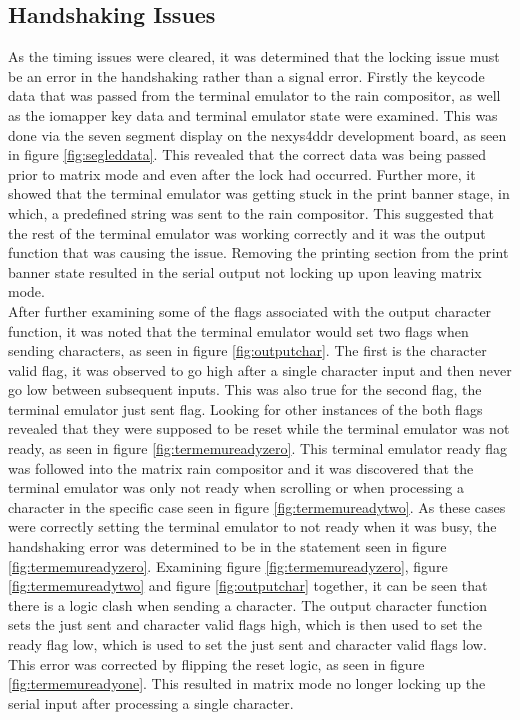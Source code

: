 \subsection{Handshaking Issues}

\label{Ch5 Sec1 Sub3}

As the timing issues were cleared, it was determined that the locking issue must be an error in the handshaking rather than a signal error. Firstly the keycode data that was passed from the terminal emulator to the rain compositor, as well as the iomapper key data and terminal emulator state were examined. This was done via the seven segment display on the nexys4ddr development board, as seen in figure \ref{fig:segleddata}. This revealed that the correct data was being passed prior to matrix mode and even after the lock had occurred. Further more, it showed that the terminal emulator was getting stuck in the print banner stage, in which, a predefined string was sent to the rain compositor. This suggested that the rest of the terminal emulator was working correctly and it was the output function that was causing the issue. Removing the printing section from the print banner state resulted in the serial output not locking up upon leaving matrix mode.\\

After further examining some of the flags associated with the output character function, it was noted that the terminal emulator would set two flags when sending characters, as seen in figure \ref{fig:outputchar}. The first is the character valid flag, it was observed to go high after a single character input and then never go low between subsequent inputs. This was also true for the second flag, the terminal emulator just sent flag. Looking for other instances of the both flags revealed that they were supposed to be reset while the terminal emulator was not ready, as seen in figure \ref{fig:termemureadyzero}. This terminal emulator ready flag was followed into the matrix rain compositor and it was discovered that the terminal emulator was only not ready when scrolling or when processing a character in the specific case seen in figure \ref{fig:termemureadytwo}. As these cases were correctly setting the terminal emulator to not ready when it was busy, the handshaking error was determined to be in the statement seen in figure \ref{fig:termemureadyzero}. Examining figure \ref{fig:termemureadyzero}, figure \ref{fig:termemureadytwo} and figure \ref{fig:outputchar} together, it can be seen that there is a logic clash when sending a character. The output character function sets the just sent and character valid flags high, which is then used to set the ready flag low, which is used to set the just sent and character valid flags low. This error was corrected by flipping the reset logic, as seen in figure \ref{fig:termemureadyone}. This resulted in matrix mode no longer locking up the serial input after processing a single character.

